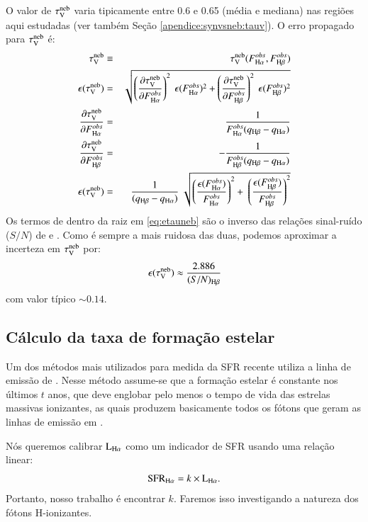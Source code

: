 O valor de $\tau_{\mathrm{V}}^{\mathrm{neb}}$ varia tipicamente entre 0.6 e 0.65 (média e mediana) nas regiões aqui estudadas (ver também Seção \ref{apendice:synvsneb:tauv}).
O erro propagado para $\tau_{\mathrm{V}}^{\mathrm{neb}}$ é:
\begin{eqnarray}
	\tauVN &\equiv& \tauVN(F_{\Ha}^{obs}, F_{\Hb}^{obs}) \\
	\epsilon (\tauVN) &=& \sqrt{\left(\del{\tauVN}{F_{\Ha}^{obs}}\right)^2 \
\epsilon (F_{\Ha}^{obs})^2 + \left(\del{\tauVN}{F_{\Hb}^{obs}}\right)^2 \
\epsilon (F_{\Hb}^{obs})^2 } \\
	\del{\tauVN}{F_{\Ha}^{obs}} &=& \frac{1}{F_{\Ha}^{obs} (q_{\Hb} - q_{\Ha})} \\
	\del{\tauVN}{F_{\Hb}^{obs}} &=& - \frac{1}{F_{\Hb}^{obs} (q_{\Hb} - q_{\Ha})} \\
	\epsilon (\tauVN) &=& \frac{1}{(q_{\Hb} - q_{\Ha})} \
\sqrt{\left(\frac{\epsilon (F_{\Ha}^{obs})}{F_{\Ha}^{obs}}\right)^2 + \
\left(\frac{\epsilon (F_{\Hb}^{obs})}{F_{\Hb}^{obs}}\right)^2 }
	\label{eq:etauneb}
\end{eqnarray}
\noindent Os termos de dentro da raiz em \eqref{eq:etauneb} são o inverso das relações sinal-ruído ($S/N$) de \Ha e \Hb. Como \Hb é sempre a mais ruidosa das duas, podemos aproximar a incerteza em $\tau_{\mathrm{V}}^{\mathrm{neb}}$ por:
\begin{equation}
	\epsilon (\tauVN) \approx \frac{2.886}{(S/N)_{\Hb}}
	\label{eq:etaunebaprox}
\end{equation}
\noindent com valor típico $\sim 0.14$.

\subsection{Cálculo da taxa de formação estelar}
\label{apendice:EmLinesDataCube:props:SFR}
Um dos métodos mais utilizados para medida da SFR recente utiliza a linha de emissão de \Ha. Nesse método assume-se que a formação estelar é constante nos últimos $t$ anos, que deve englobar pelo menos o tempo de vida das estrelas massivas ionizantes, as quais produzem basicamente todos os fótons que geram as linhas de emissão em \Ha.

Nós queremos calibrar $\LHalpha$ como um indicador de SFR usando uma relação linear:
\begin{equation}
	\mathrm{SFR}_{\Ha} = k \times \LHalpha.
	\label{eq:SFRHa}
\end{equation}
\noindent Portanto, nosso trabalho é encontrar $k$. Faremos isso investigando a natureza dos
fótons H-ionizantes.

